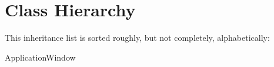 \section{Class Hierarchy}
This inheritance list is sorted roughly, but not completely, alphabetically\+:\begin{DoxyCompactList}
\item Application\+Window\begin{DoxyCompactList}
\item {}
\end{DoxyCompactList}
\end{DoxyCompactList}
